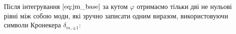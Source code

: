 %
%
%
%
Після інтегрування $ \eqref{eq:jm_base} $ за кутом $ \varphi $ отримаємо 
тільки дві не нульові рівні між собою моди, які зручно записати одним 
виразом, використовуючи символи Кронекера $ \delta_{m,\pm1} $:

